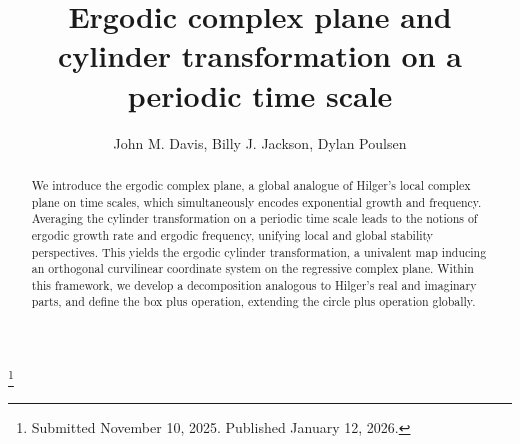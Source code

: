 \documentclass[reqno]{amsart}
\begin{document}
\title[\hfilneg EJDE-2026/04\hfil Ergodic complex plane and cylinder transformation]
{Ergodic complex plane and cylinder transformation on a periodic time scale}

\author[J. M. Davis, B. J. Jackson, D. Poulsen \hfil EJDE-2026/04\hfilneg]
{John M. Davis, Billy J. Jackson, Dylan Poulsen}

\address{John M. Davis \newline
Department of Mathematics,
Baylor University, Waco, TX 76798, USA}

\address{Billy J. Jackson \newline
Department of Mathematics,
Statistics, and Computer Science,
University of Illinois, Chicago, IL 60607, USA}

\address{Dylan Poulsen \newline
Department of Mathematics and Computer Science,
Washington College,
Chestertown, MD 21620, USA}

\thanks{Submitted November 10, 2025. Published January 12, 2026.}

\begin{abstract}
We introduce the ergodic complex plane, a global analogue of Hilger's local complex
plane on time scales, which simultaneously encodes exponential growth and frequency.
Averaging the cylinder transformation on a periodic time scale leads to the notions
of ergodic growth rate and ergodic frequency, unifying local and global stability
perspectives. This yields the ergodic cylinder transformation, a univalent map inducing
an orthogonal curvilinear coordinate system on the regressive complex plane. Within
this framework, we develop a decomposition analogous to Hilger's real and imaginary
parts, and define the box plus operation, extending the circle plus operation globally.
\end{abstract}

\maketitle
{}
\newtheorem{theorem}{Theorem}[section]
\newtheorem{lemma}[theorem]{Lemma}
\newtheorem{definition}[theorem]{Definition}
\newtheorem{proposition}[theorem]{Proposition}
\newtheorem{remark}[theorem]{Remark}
\newtheorem{example}[theorem]{Example}
\allowdisplaybreaks
\end{document}
